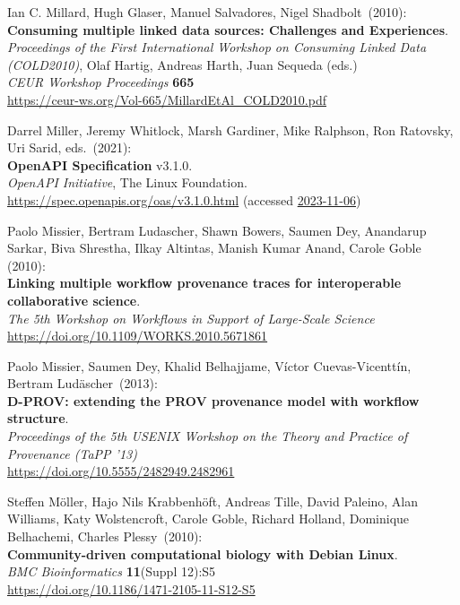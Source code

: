\begin{thebibliography}{9}
Ian C. Millard, Hugh Glaser, Manuel Salvadores, Nigel Shadbolt~(2010): \\
\textbf{Consuming multiple linked data sources: Challenges and Experiences}.\\
\emph{Proceedings of the First International Workshop on Consuming Linked Data (COLD2010)}, 
Olaf Hartig, Andreas Harth, Juan Sequeda (eds.) \\
\emph{CEUR Workshop Proceedings} \textbf{665}\\
\url{https://ceur-ws.org/Vol-665/MillardEtAl_COLD2010.pdf}

Darrel Miller, Jeremy Whitlock, Marsh Gardiner, Mike Ralphson, Ron Ratovsky, Uri Sarid, eds.~(2021): \\
\textbf{OpenAPI Specification} v3.1.0.\\
\emph{OpenAPI Initiative}, The Linux Foundation.\\
\url{https://spec.openapis.org/oas/v3.1.0.html} 
(accessed \href{https://web.archive.org/web/20231106014946/https://spec.openapis.org/oas/v3.1.0.html}{2023-11-06})

Paolo Missier, Bertram Ludascher, Shawn Bowers, Saumen Dey, Anandarup Sarkar, Biva Shrestha, Ilkay Altintas, Manish Kumar Anand, Carole Goble (2010):\\
\textbf{Linking multiple workflow provenance traces for interoperable collaborative science}.\\
\emph{The 5th Workshop on Workflows in Support of Large-Scale Science} \\
\url{https://doi.org/10.1109/WORKS.2010.5671861}

Paolo Missier, Saumen Dey, Khalid Belhajjame, Víctor Cuevas-Vicenttín, Bertram Ludäscher~(2013): \\
\textbf{D-PROV: extending the PROV provenance model with workflow structure}.\\
\emph{Proceedings of the 5th USENIX Workshop on the Theory and Practice of Provenance (TaPP '13)}\\
\url{https://doi.org/10.5555/2482949.2482961}

Steffen Möller, Hajo Nils Krabbenhöft, Andreas Tille, David Paleino, Alan Williams, Katy Wolstencroft, Carole Goble, Richard Holland, Dominique Belhachemi, Charles Plessy~(2010): \\
\textbf{Community-driven computational biology with Debian Linux}.\\
\emph{BMC Bioinformatics} \textbf{11}(Suppl 12):S5\\
\url{https://doi.org/10.1186/1471-2105-11-S12-S5}


\end{thebibliography}
